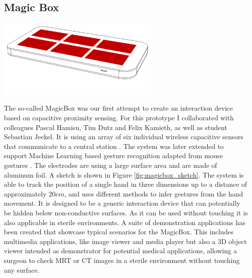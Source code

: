 \subsection{Magic Box}
\label{ch:prot_magicbox}
\begin{minipage}{\linewidth}
\centering
\includegraphics[width=0.6\textwidth]{images/magicbox}
\label{fig:magicbox_sketch}
\end{minipage}
The so-called MagicBox was our first attempt to create an interaction device based on capacitive proximity sensing. For this prototype I collaborated with colleagues Pascal Hamisu, Tim Dutz and Felix Kamieth, as well as student Sebastian Jeckel. It is using an array of six individual wireless capacitive sensors that communicate to a central station \cite{Braun2011MultiInputDevice}. The system was later extended to support Machine Learning based gesture recognition adapted from mouse gestures \cite{braun2013capacitive}. The electrodes are using a large surface area and are made of aluminum foil. A sketch is shown in Figure \ref{fig:magicbox_sketch}. The system is able to track the position of a single hand in three dimensions up to a distance of approximately $20cm$, and uses different methods to infer gestures from the hand movement. 
It is designed to be a generic interaction device that can potentially be hidden below non-conductive surfaces. As it can be used without touching it is also applicable in sterile environments. A suite of demonstration applications has been created that showcase typical scenarios for the MagicBox. This includes multimedia applications, like image viewer and media player but also a 3D object viewer intended as demonstrator for potential medical applications, allowing a surgeon to check MRT or CT images in a sterile environment without touching any surface.

